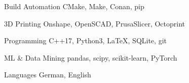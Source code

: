 \documentclass[11pt, a4paper]{Awesome-CV/awesome-cv}
\begin{document}
\begin{cvskills}



    \cvskill
    {Build Automation} %
    {CMake, Make, Conan, pip} %

    \cvskill
    {3D Printing}
    {Onshape, OpenSCAD, PrusaSlicer, Octoprint}


    \cvskill
    {Programming} %
    {C++17, Python3, LaTeX, SQLite, git} %

    \cvskill
    {ML \& Data Mining} %
    {pandas, scipy, scikit-learn, PyTorch} %

    \cvskill
    {Languages} %
    {German, English} %

\end{cvskills}
\end{document}
